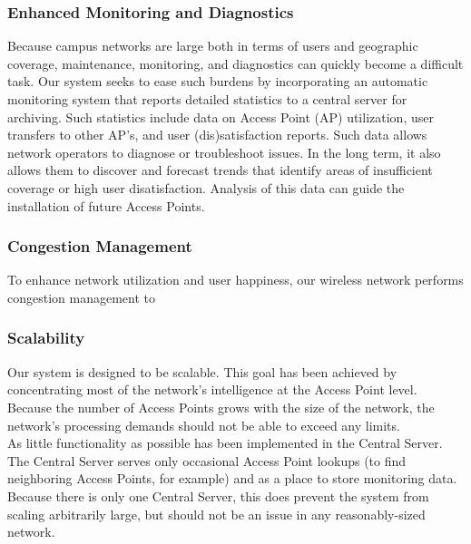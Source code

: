 \documentclass[11pt,twocolumn]{article}
\begin{document}
\subsubsection{Enhanced Monitoring and Diagnostics}
\indent Because campus networks are large both in terms of users and geographic coverage, maintenance, monitoring, and diagnostics can quickly become a
difficult task. Our system seeks to ease such burdens by incorporating an automatic monitoring system that reports detailed statistics to a central
server for archiving. Such statistics include data on Access Point (AP) utilization, user transfers to other AP's, and user (dis)satisfaction reports.
\indent Such data allows network operators to diagnose or troubleshoot issues. In the long term, it also allows them to discover and forecast trends that
identify areas of insufficient coverage or high user disatisfaction. Analysis of this data can guide the installation of future Access Points.
\subsubsection{Congestion Management}
\indent To enhance network utilization and user happiness, our wireless network performs congestion management to 
\subsubsection{Scalability}
\indent Our system is designed to be scalable. This goal has been achieved by concentrating most of the network's intelligence at the Access Point
level. Because the number of Access Points grows with the size of the network, the network's processing demands should not be able to exceed any
limits. \\
\indent As little functionality as possible has been implemented in the Central Server. The Central Server serves only occasional Access Point lookups (to
find neighboring Access Points, for example) and as a place to store monitoring data. Because there is only one Central Server, this does prevent the 
system from scaling arbitrarily large, but should not be an issue in any reasonably-sized network. 
\end{document}
